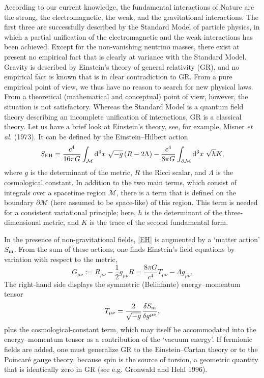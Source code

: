 \documentclass[12pt,a4paper]{article}
\newcommand{\be}{\begin{equation}}
\newcommand{\ee}{\end{equation}}
\newcommand{\lb}{\label}
\begin{document}
According to our current knowledge, the fundamental interactions of
Nature are the strong, the electromagnetic, the weak, and the
gravitational interactions. The first three are successfully described
by the Standard Model of particle physics, in which a partial
unification of the electromagnetic and the weak interactions has been
achieved. Except for the non-vanishing neutrino masses, there
exist at present no empirical fact that is clearly at variance with the
Standard Model. Gravity is described by Einstein's theory of general
relativity (GR), and no empirical fact is known that is in clear
contradiction to GR. From a pure empirical point of view, we thus have no
reason to search for new physical laws. From a theoretical
(mathematical and conceptual) point of view, however, the situation is
not satisfactory. Whereas the Standard Model is a quantum field theory
describing an incomplete unification of interactions, GR is a
classical theory. Let us have a brief look at Einstein's theory, see,
for example, Misner {\em et al.} (1973). 
It can be defined by the Einstein--Hilbert action
\be
S_{\rm EH}= \frac{c^4}{16\pi G}\int_{\mathcal M}{\rm d}^4x\ \sqrt{-g}
 \left(R-2\Lambda\right)- \frac{c^4}{8\pi G}
\int_{\partial\mathcal M}{\rm d}^3x\ \sqrt{h}K  ,
\lb{EH}
\ee
where $g$ is the determinant of the metric, $R$ the Ricci scalar, and
$\Lambda$ is the cosmological constant. In addition to the two main terms,
which consist of integrals over a spacetime region ${\mathcal M}$,
there is a term that is defined on the boundary ${\partial\mathcal M}$
(here assumed to be space-like) of this region. This term is needed
for a consistent 
variational principle; here, $h$ is the determinant of the
three-dimensional metric, and $K$ is the trace of the second
fundamental form. 

In the presence of non-gravitational fields, \eqref{EH} is augmented
by a `matter action' $S_{\rm m}$. From the sum of these actions,
one finds Einstein's field equations by variation with respect to the metric, 
\be
G_{\mu\nu}:= R_{\mu\nu}-\frac{1}{2}g_{\mu\nu}R
= \frac{8\pi G}{c^4}T_{\mu\nu}-\Lambda g_{\mu\nu} .
\lb{einstein}
\ee
The right-hand side displays the symmetric (Belinfante)
energy--momentum tensor
\be
T_{\mu\nu}=\frac{2}{\sqrt{-g}}\frac{\delta S_{\rm m}}{\delta g^{\mu\nu}} ,
\lb{em}
\ee
plus the cosmological-constant term, which may itself be accommodated
into the energy--momentum tensor as a contribution of the `vacuum energy'. 
If fermionic fields are added, one must generalize GR to the
Einstein--Cartan theory or to the Poincar\'e gauge theory, because spin
is the source of torsion, a geometric quantity that is identically
zero in GR (see e.g. Gronwald and Hehl 1996).
\end{document}
